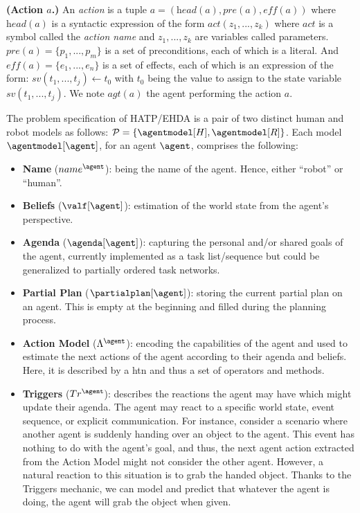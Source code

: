 \begin{definition}
    \textbf{(Action $a$.)} An \emph{action} is a tuple $a = (\textit{head}(a), \textit{pre}(a), \textit{eff}(a))$ where $\textit{head}(a)$ is a syntactic expression of the form $\textit{act}(z_1, ..., z_k)$ where $act$ is a symbol called the \emph{action name} and $z_1,...,z_k$ are variables called parameters. $\textit{pre}(a) = \{ p_1, ..., p_m \}$ is a set of preconditions, each of which is a literal. And $\textit{eff}(a) = \{ e_1, ..., e_n \}$ is a set of effects, each of which is an expression of the form: $sv(t_1, ..., t_j) \leftarrow t_0$ with $t_0$ being the value to assign to the state variable $sv(t_1, ..., t_j)$. We note $\textit{agt}(a)$ the agent performing the action $a$.
    \label{def:action}
\end{definition}


The problem specification of HATP/EHDA is a pair of two distinct human and robot models as follows: $\mathcal{P} = \{ \agentmodel[H], \agentmodel[R] \}$. Each model $\agentmodel[\agent]$, for an agent $\agent$, comprises the following:
\begin{itemize}
    \item \textbf{Name} ($name^{\agent}$): being the name of the agent. Hence, either ``robot'' or ``human''.
    
    \item \textbf{Beliefs} ($\valf[\agent]$): estimation of the world state from the agent's perspective.
    
    \item \textbf{Agenda} ($\agenda[\agent]$): capturing the personal and/or shared goals of the agent, currently implemented as a task list/sequence but could be generalized to partially ordered task networks.
    
    \item \textbf{Partial Plan} ($\partialplan[\agent]$): storing the current partial plan on an agent. This is empty at the beginning and filled during the planning process.
    
    \item \textbf{Action Model} ($\Lambda^{\agent}$): encoding the capabilities of the agent and used to estimate the next actions of the agent according to their agenda and beliefs. Here, it is described by a \acrfull{htn} and thus a set of operators and methods. 
    
    \item \textbf{Triggers} ($Tr^{\agent}$): describes the reactions the agent may have which might update their agenda. The agent may react to a specific world state, event sequence, or explicit communication. For instance, consider a scenario where another agent is suddenly handing over an object to the agent. This event has nothing to do with the agent's goal, and thus, the next agent action extracted from the Action Model might not consider the other agent. However, a natural reaction to this situation is to grab the handed object. Thanks to the Triggers mechanic, we can model and predict that whatever the agent is doing, the agent will grab the object when given.  
\end{itemize}

